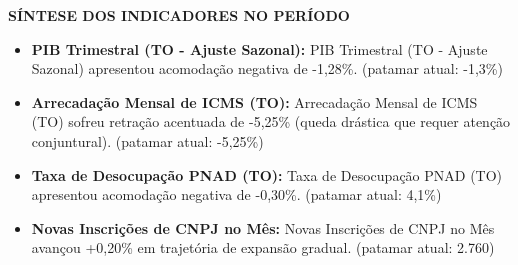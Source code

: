 \documentclass[10pt,a4paper]{article}
\begin{document}
{\hfill%
%
}


\vspace{0.10cm}

\par\vspace{0.05cm}
\par\vspace{4pt}
{\fontsize{7.8}{9.4}\selectfont\bfseries\color{corprimaria}\MakeUppercase{Síntese dos Indicadores no Período}}\par\vspace{2pt}
{\scriptsize\color{cinzatexto}
\begin{itemize}[leftmargin=10pt, itemsep=1.2pt, topsep=1pt, parsep=0pt]
   \item \textbf{\color{corprimaria}PIB Trimestral (TO - Ajuste Sazonal):} PIB Trimestral (TO - Ajuste Sazonal) apresentou acomodação negativa de -1,28\%. (patamar atual: -1,3\%)
   \item \textbf{\color{corprimaria}Arrecadação Mensal de ICMS (TO):} Arrecadação Mensal de ICMS (TO) sofreu retração acentuada de -5,25\% (queda drástica que requer atenção conjuntural). (patamar atual: -5,25\%)
   \item \textbf{\color{corprimaria}Taxa de Desocupação PNAD (TO):} Taxa de Desocupação PNAD (TO) apresentou acomodação negativa de -0,30\%. (patamar atual: 4,1\%)
   \item \textbf{\color{corprimaria}Novas Inscrições de CNPJ no Mês:} Novas Inscrições de CNPJ no Mês avançou +0,20\% em trajetória de expansão gradual. (patamar atual: 2.760)
\end{itemize}
}
\par\vspace{0.05cm}
\end{document}
